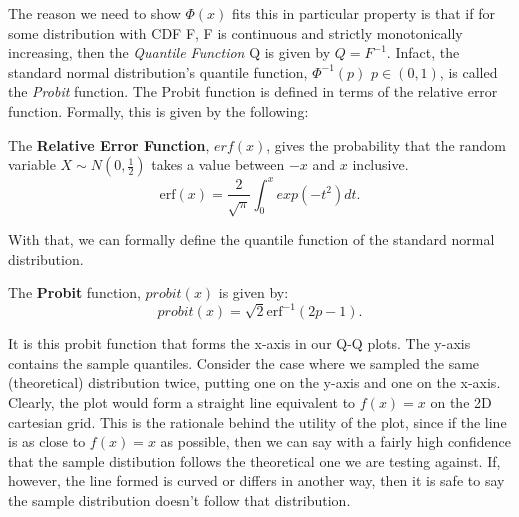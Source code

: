 The reason we need to show $\Phi(x)$ fits this in particular property is that if for some distribution with CDF F, F is continuous and strictly monotonically increasing, then 
the \textit{Quantile Function} Q is given by $Q = F^{-1}$. Infact, the standard normal distribution's quantile function, $\Phi^{-1}(p)$ $p \in (0,1)$, is called the \textit{Probit}
function. The Probit function is defined in terms of the relative error function. Formally, this is given by the following:

\begin{definition}
    The \textbf{Relative Error Function}, $erf(x)$, gives the probability that the random variable $X \sim N(0,\frac{1}{2})$ takes a value between $-x$ and $x$ inclusive. 
    \[
        \text{erf}(x) = \frac{2}{\sqrt{\pi}}\int_0^x exp(-t^2)dt.    
    \]
\end{definition}

With that, we can formally define the quantile function of the standard normal distribution.

\begin{definition}
    The \textbf{Probit} function, $probit(x)$ is given by:
    \[
        probit(x) = \sqrt{2}\text{erf}^{-1}(2p-1).  
    \]
\end{definition}

It is this probit function that forms the x-axis in our Q-Q plots. The y-axis contains the sample quantiles. Consider the case where we sampled the same (theoretical) distribution twice,
putting one on the y-axis and one on the x-axis. Clearly, the plot would form a straight line equivalent to $f(x)=x$ on the 2D cartesian grid. This is the rationale behind the utility of the plot, since 
if the line is as close to $f(x)=x$ as possible, then we can say with a fairly high confidence that the sample distibution follows the theoretical one we are testing against. If, however, the line formed is curved or differs in another way, then it is safe to say the sample distribution doesn't follow that distribution. 